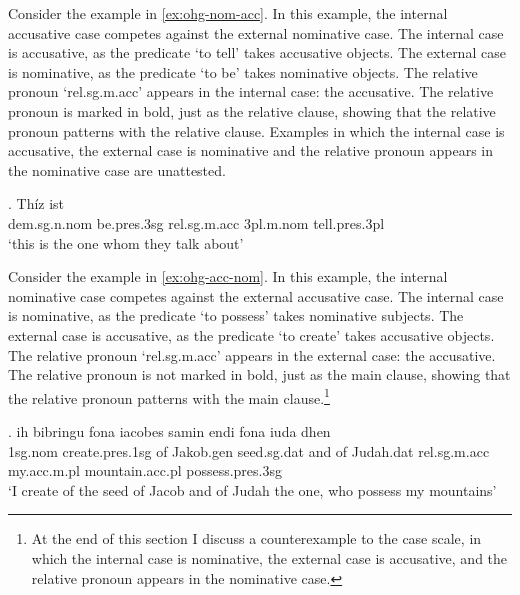 Consider the example in \ref{ex:ohg-nom-acc}. In this example, the internal accusative case competes against the external nominative case.
The internal case is accusative, as the predicate  `to tell' takes accusative objects.
The external case is nominative, as the predicate  `to be' takes nominative objects.
The relative pronoun  `\ac{rel}.\ac{sg}.\ac{m}.\ac{acc}' appears in the internal case: the accusative. The relative pronoun is marked in bold, just as the relative clause, showing that the relative pronoun patterns with the relative clause.
Examples in which the internal case is accusative, the external case is nominative and the relative pronoun appears in the nominative case are unattested.

\exg. Thíz ist   \\
\ac{dem}.\ac{sg}.\ac{n}.\ac{nom} be.\ac{pres}.3\ac{sg}\scsub{[nom]} \ac{rel}.\ac{sg}.\ac{m}.\ac{acc} 3\ac{pl}.\ac{m}.\ac{nom} tell.\ac{pres}.3\ac{pl}\scsub{[acc]}\\
`this is the one whom they talk about' \label{ex:ohg-nom-acc}

Consider the example in \ref{ex:ohg-acc-nom}. In this example, the internal nominative case competes against the external accusative case.
The internal case is nominative, as the predicate  `to possess' takes nominative subjects.
The external case is accusative, as the predicate  `to create' takes accusative objects.
The relative pronoun  `\ac{rel}.\ac{sg}.\ac{m}.\ac{acc}' appears in the external case: the accusative. The relative pronoun is not marked in bold, just as the main clause, showing that the relative pronoun patterns with the main clause.\footnote{
At the end of this section I discuss a counterexample to the case scale, in which the internal case is nominative, the external case is accusative, and the relative pronoun appears in the nominative case.
}

\exg. ih bibringu fona iacobes samin endi fona iuda dhen   \\
1\ac{sg}.\ac{nom} {create}.\ac{pres}.1\ac{sg}\scsub{[acc]} of Jakob.\ac{gen} seed.\ac{sg}.\ac{dat} and of Judah.\ac{dat} \ac{rel}.\ac{sg}.\ac{m}.\ac{acc} my.\ac{acc}.\ac{m}.\ac{pl} mountain.\ac{acc}.\ac{pl} possess.\ac{pres}.3\ac{sg}\scsub{[nom]}\\
`I create of the seed of Jacob and of Judah the one, who possess my mountains' \label{ex:ohg-acc-nom}

